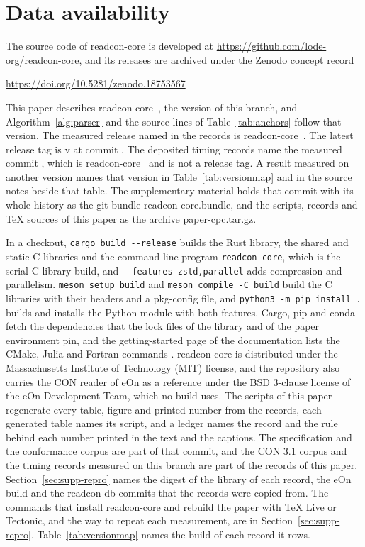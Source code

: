 \documentclass[preprint,12pt]{elsarticle}
\begin{document}
\FloatBarrier \section*{Data availability}\label{sec:data} The source code of readcon-core is developed at \url{https://github.com/lode-org/readcon-core}, and its releases are archived under the Zenodo concept record \cite{goswamiReadconcoreConConvel2026} \begin{center} \url{https://doi.org/10.5281/zenodo.18753567} \end{center}
This paper describes readcon-core~\readconCargoVersion{}, the version of this branch, and Algorithm~\ref{alg:parser} and the source lines of Table~\ref*{tab:anchors} follow that version.
The measured release named in the records is readcon-core~\readconversion{}.
The latest release tag is v\rcLatestTag{} at commit {\ttfamily\expandafter\seqsplit\expandafter{\rcLatestTagCommit}}.
The deposited timing records name the measured commit {\ttfamily\expandafter\seqsplit\expandafter{\readconcommit}}, which is readcon-core~\rcMeasuredVersion{} and is not a release tag.
A result measured on another version names that version in Table~\ref*{tab:versionmap} and in the source notes beside that table.
The supplementary material holds that commit with its whole history as the git bundle readcon-core.bundle, and the scripts, records and TeX sources of this paper as the archive paper-cpc.tar.gz.

In a checkout, \texttt{cargo build -{}-release} builds the Rust library, the shared and static C libraries and the command-line program \texttt{readcon-core}, which is the serial C library build, and \texttt{-{}-features zstd,parallel} adds compression and parallelism.
\texttt{meson setup build} and \texttt{meson compile -C build} build the C libraries with their headers and a pkg-config file, and \texttt{python3 -m pip install .} builds and installs the Python module with both features.
Cargo, pip and conda fetch the dependencies that the lock files of the library and of the paper environment pin, and the getting-started page of the documentation lists the CMake, Julia and Fortran commands \cite{readconDocsInstall}.
readcon-core is distributed under the Massachusetts Institute of Technology (MIT) license, and the repository also carries the CON reader of eOn as a reference under the BSD 3-clause license of the eOn Development Team, which no build uses.
The scripts of this paper regenerate every table, figure and printed number from the records, each generated table names its script, and a ledger names the record and the rule behind each number printed in the text and the captions.
The specification and the conformance corpus are part of that commit, and the CON 3.1 corpus and the timing records measured on this branch are part of the records of this paper.
Section~\ref*{sec:supp-repro} names the digest of the library of each record, the eOn build and the readcon-db commits that the records were copied from.
The commands that install readcon-core and rebuild the paper with TeX Live or Tectonic, and the way to repeat each measurement, are in Section~\ref*{sec:supp-repro}.
Table~\ref*{tab:versionmap} names the build of each record it rows.
\end{document}
